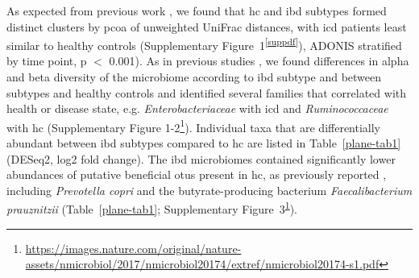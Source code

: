 As expected from previous work \cite{RN154,Willing2010}, we found that \gls{hc} and \gls{ibd} subtypes formed distinct clusters by \gls{pcoa} of unweighted UniFrac distances, with \gls{icd} patients least similar to healthy controls (Supplementary Figure~1\textsuperscript{\ref{suppdf}}), ADONIS stratified by time point, p $<$ 0.001). As in previous studies \cite{ Rajca2014,Willing2010,Wills2014}, we found differences in alpha and beta diversity of the microbiome according to \gls{ibd} subtype and between subtypes and healthy controls and identified several families that correlated with health or disease state, e.g. \textit{Enterobacteriaceae} with \gls{icd} and \textit{Ruminococcaceae} with \gls{hc} (Supplementary Figure 1-2\footnote{\label{supPdf2}\url{https://images.nature.com/original/nature-assets/nmicrobiol/2017/nmicrobiol20174/extref/nmicrobiol20174-s1.pdf}}).  Individual taxa that are differentially abundant between \gls{ibd} subtypes compared to \gls{hc} are listed in Table~\ref{plane-tab1} (DESeq2, log2 fold change). The \gls{ibd} microbiomes contained significantly lower abundances of putative beneficial \glspl{otu} present in \gls{hc}, as previously reported \cite{RN154,Rajca2014,Sokol2008,Willing2009,Willing2010,Wills2014}, including \textit{Prevotella copri} and the butyrate-producing bacterium \textit{Faecalibacterium prauznitzii} (Table~\ref{plane-tab1}; Supplementary Figure~3\textsuperscript{\ref{supPdf2}}).

